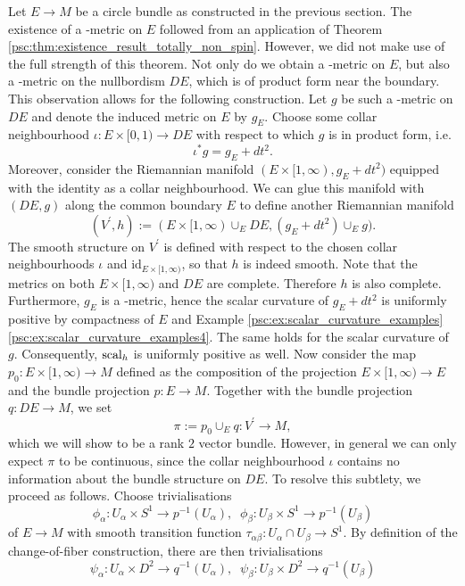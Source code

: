 Let $E \to M$ be a circle bundle as constructed in the previous section. The existence of a \psc-metric on $E$ followed from an application of Theorem \ref{psc:thm:existence_result_totally_non_spin}. However, we did not make use of the full strength of this theorem. Not only do we obtain a \psc-metric on $E$, but also a \psc-metric on the nullbordism $DE$, which is of product form near the boundary. This observation allows for the following construction. Let $g$ be such a \psc-metric on $DE$ and denote the induced metric on $E$ by $g_E$. Choose some collar neighbourhood $\iota \colon E \times [0,1) \to DE$ with respect to which $g$ is in product form, i.e. 
\[
\iota^\ast g = g_E + dt^2.
\]
Moreover, consider the Riemannian manifold $(E \times [1,\infty), g_E + dt^2)$ equipped with the identity as a collar neighbourhood. We can glue this manifold with $(DE, g)$ along the common boundary $E$ to define another Riemannian manifold 
\[
(V^\prime, h) := (E \times [1,\infty) \cup_E DE, (g_E + dt^2) \cup_E g).
\]
The smooth structure on $V^\prime$ is defined with respect to the chosen collar neighbourhoods $\iota$ and $\mathrm{id}_{E \times [1,\infty)}$, so that $h$ is indeed smooth. Note that the metrics on both $E \times [1,\infty)$ and $DE$ are complete. Therefore $h$ is also complete. Furthermore, $g_E$ is a \psc-metric, hence the scalar curvature of $g_E + dt^2$ is uniformly positive by compactness of $E$ and \linebreak Example \ref{psc:ex:scalar_curvature_examples} \ref{psc:ex:scalar_curvature_examples4}. The same holds for the scalar curvature of $g$. Consequently, $\mathrm{scal}_h$ is uniformly positive as well. Now consider the map $p_0 \colon E \times [1,\infty) \to M$ defined as the composition of the projection $E \times [1,\infty) \to E$ and the bundle projection $p \colon E \to M$. Together with the bundle projection $q \colon DE \to M$, we set
\[
\pi := p_0 \cup_E q \colon V^\prime \to M,
\] 
which we will show to be a rank $2$ vector bundle. However, in general we can only expect $\pi$ to be continuous, since the collar neighbourhood $\iota$ contains no information about the bundle structure on $DE$. To resolve this subtlety, we proceed as follows. Choose trivialisations
\[
\phi_\alpha \colon U_\alpha \times S^1 \to p^{-1}(U_\alpha), \;\; \phi_\beta \colon U_\beta \times S^1 \to p^{-1}(U_\beta)
\]
of $E \to M$ with smooth transition function $\tau_{\alpha\beta} \colon U_\alpha \cap U_\beta \to S^1$. By definition of the change-of-fiber construction, there are then trivialisations
\[
\psi_\alpha \colon U_\alpha \times D^2 \to q^{-1}(U_\alpha), \;\; \psi_\beta \colon U_\beta \times D^2 \to q^{-1}(U_\beta)
\]
